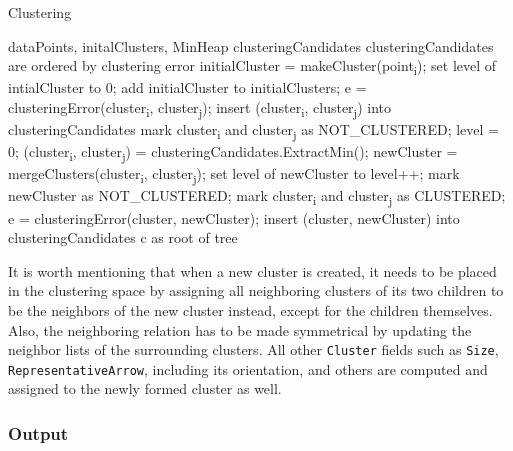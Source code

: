 \begin{algorithm}[H]
\caption{Clustering}
\begin{algorithmic}[1]

\Require dataPoints, initalClusters, MinHeap clusteringCandidates \Comment clusteringCandidates are ordered by clustering error
\Statex
{}
	\State initialCluster = makeCluster(point\textsubscript{i});
    \State set level of intialCluster to 0;
    \State add initialCluster to initialClusters;
\EndFor
\Statex
{}
    	\State e = clusteringError(cluster\textsubscript{i}, cluster\textsubscript{j});
        \State insert (cluster\textsubscript{i}, cluster\textsubscript{j}) into clusteringCandidates
        \State mark cluster\textsubscript{i} and cluster\textsubscript{j} as NOT\_CLUSTERED;
    \EndFor
\EndFor
\Statex
\State level = 0;
	\State (cluster\textsubscript{i}, cluster\textsubscript{j}) = clusteringCandidates.ExtractMin();
    	\State newCluster = mergeClusters(cluster\textsubscript{i}, cluster\textsubscript{j});
        \State set level of newCluster to level++;
		\State mark newCluster as NOT\_CLUSTERED;
        \State mark cluster\textsubscript{i} and cluster\textsubscript{j} as CLUSTERED;
        	\State e = clusteringError(cluster, newCluster);
            \State insert (cluster, newCluster) into clusteringCandidates
        \EndFor
    \EndIf
\EndWhile
\Statex
\Return c as root of tree
\end{algorithmic}
\end{algorithm}

It is worth mentioning that when a new cluster is created, it needs to be placed in the clustering space by assigning all neighboring clusters of its two children to be the neighbors of the new cluster instead, except for the children themselves. Also, the neighboring relation has to be made symmetrical by updating the neighbor lists of the surrounding clusters. All other \verb+Cluster+ fields such as \verb+Size+, \verb+RepresentativeArrow+, including its orientation, and others are computed and assigned to the newly formed cluster as well.

\subsubsection{Output}

